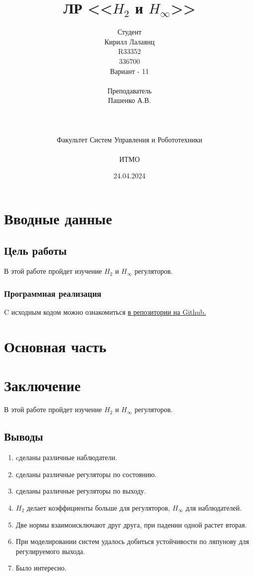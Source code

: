 \documentclass[16pt]{article}
\title{ЛР \textnumero 11 <<\(H_2\) и \(H_\infty\)>>}
\author{
Студент \\
Кирилл Лалаянц\\
R33352\\
336700\\
Вариант - 11\\
\\
Преподаватель\\
Пашенко А.В. \\
\\
\\
\\
Факультет Систем Управления и Робототехники\\
\\
ИТМО\\
}
\date{24.04.2024}
\begin{document}
\maketitle
\newpage
\tableofcontents
\thispagestyle{empty}

\newpage
\setcounter{page}{1}
\section{Вводные данные}
\subsection{Цель работы}
В этой работе пройдет изучение \(H_2\) и \(H_\infty\) регуляторов.

\subsubsection{Программная реализация}
C исходным кодом можно ознакомиться \href{https://github.com/lalayants/control-theory-itmo-2023-2024}{в репозитории на Github.}


\newpage
\section{Основная часть}

\FloatBarrier


\FloatBarrier


\FloatBarrier


\FloatBarrier


\FloatBarrier

\newpage
\section{Заключение}
В этой работе пройдет изучение \(H_2\) и \(H_\infty\) регуляторов.
\subsection{Выводы}
\begin{enumerate}
   \item cделаны различные наблюдатели.
   \item сделаны различные регуляторы по состоянию.
   \item сделаны различные регуляторы по выходу.
   \item \(H_2\) делает коэффициенты больше для регуляторов, \(H_\infty\) для наблюдателей.
   \item Две нормы взаимоисключают друг друга, при падении одной растет вторая. 
   \item При моделировании систем удалось добиться устойчивости по ляпунову для регулируемого выхода. 
   \item Было интересно.
\end{enumerate}
\end{document}
